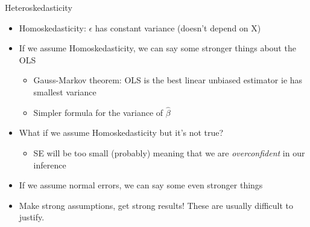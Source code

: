 \documentclass[aspectratio=169]{beamer}
\begin{document}
\begin{frame}{Heteroskedasticity}
    \begin{itemize}
        \item Homoskedasticity: $\epsilon$ has constant variance (doesn't depend on X)
        \item If we assume Homoskedasticity, we can say some stronger things about the OLS
        \begin{itemize}
            \item Gauss-Markov theorem: OLS is the best linear unbiased estimator ie has smallest variance
            \item Simpler formula for the variance of $\hat{\beta}$
        \end{itemize}
        \item What if we assume Homoskedasticity but it's not true?
        \begin{itemize}
            \item SE will be too small (probably) meaning that we are \textit{overconfident} in our inference
        \end{itemize}
        \item If we assume normal errors, we can say some even stronger things
        \item Make strong assumptions, get strong results! These are usually difficult to justify.
    \end{itemize}
\end{frame}
\end{document}
